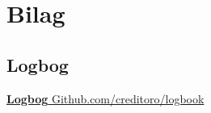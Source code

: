 \section{Bilag}

\subsection{Logbog}
\href{https://github.com/creditoro/logbook}{\textbf{Logbog} Github.com/creditoro/logbook}